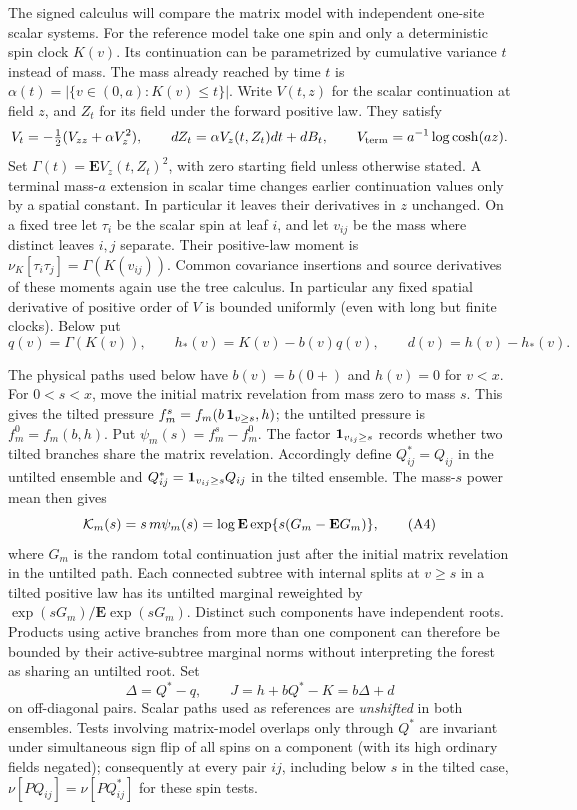 The signed calculus will compare the matrix model with independent
one-site scalar systems. For the reference model take one spin and only a deterministic spin clock
\(K(v)\). Its continuation can be parametrized by cumulative variance
\(t\) instead of mass. The mass already reached by time \(t\) is
\(\alpha(t)=|\{v\in(0,a):K(v)\le t\}|\). Write \(V(t,z)\) for
the scalar continuation at field \(z\), and \(Z_t\) for its field under
the forward positive law. They satisfy
\[
 V_t=-\tfrac12(V_{zz}+\alpha V_z^2),\qquad dZ_t=\alpha V_z(t,Z_t)dt+dB_t ,
 \qquad V_{\rm term}=a^{-1}\log\cosh(a z).
\]
Set \(\Gamma(t)=\mathbf E V_z(t,Z_t)^2\), with zero starting field
unless otherwise stated. A terminal mass-\(a\) extension in scalar time
changes earlier continuation values only by a spatial constant. In
particular it leaves their derivatives in \(z\) unchanged. On a fixed
tree let \(\tau_i\) be the scalar spin at leaf \(i\), and let
\(v_{ij}\) be the mass where distinct leaves \(i,j\) separate.
Their positive-law moment is
\(\nu_K[\tau_i\tau_j]=\Gamma(K(v_{ij}))\). Common covariance insertions and source derivatives of these moments again use the tree calculus. In particular any fixed spatial derivative of positive order of \(V\) is bounded uniformly (even with long but finite clocks). Below put
\[
 q(v)=\Gamma(K(v)),\qquad h_*(v)=K(v)-b(v)q(v),\qquad d(v)=h(v)-h_*(v).
\]

The physical paths used below have \(b(v)=b(0+)\) and \(h(v)=0\)
for \(v<x\). For \(0<s<x\), move the initial matrix revelation
from mass zero to mass \(s\). This gives the tilted pressure
\(f_m^s=f_m(b\,{\bf1}_{v\ge s},h)\); the untilted pressure is
\(f_m^0=f_m(b,h)\). Put \(\psi_m(s)=f_m^s-f_m^0\). The factor
\({\bf1}_{v_{ij}\ge s}\) records whether two tilted branches share
the matrix revelation. Accordingly define \(Q^*_{ij}=Q_{ij}\) in
the untilted ensemble and
\(Q^*_{ij}={\bf1}_{v_{ij}\ge s}Q_{ij}\) in the tilted ensemble.
The mass-\(s\) power mean then gives
\[
 {\cal K}_m(s)=s\,m\psi_m(s)=\log\mathbf E\exp\{s(G_m-\mathbf E G_m)\},
                                                               \tag{A4}\label{eq:A4}
\]
where \(G_m\) is the random total continuation just after the initial matrix revelation in the untilted path. Each connected subtree with internal splits at \(v\ge s\) in a tilted positive law has its untilted marginal reweighted by \(\exp(sG_m)/\mathbf E\exp(sG_m)\). Distinct such components have independent roots. Products using active branches from more than one component can therefore be bounded by their active-subtree marginal norms without interpreting the forest as sharing an untilted root. Set
\[
 \Delta=Q^*-q,\qquad J=h+b Q^*-K=b\Delta+d
\]
on off-diagonal pairs. Scalar paths used as references are \emph{unshifted} in both ensembles. Tests involving matrix-model overlaps only through \(Q^*\) are invariant under simultaneous sign flip of all spins on a component (with its high ordinary fields negated); consequently at every pair \(ij\), including below \(s\) in the tilted case, \(\nu[P Q_{ij}]=\nu[P Q^*_{ij}]\) for these spin tests.

